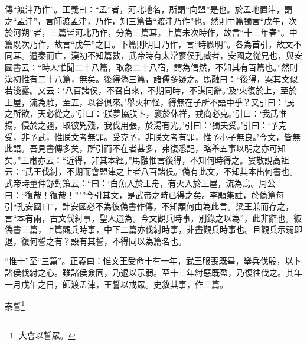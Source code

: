 {\noindent\zhuan{}\fzbyks 傳“渡津乃作”。正義曰：“孟”者，河北地名，所謂“向盟”是也。於孟地置津，謂之“孟津”，言師渡孟津，乃作，知三篇皆“渡津乃作”也。然則中篇獨言“戊午，次於河朔”者，三篇皆河北乃作，分為三篇耳。上篇未次時作，故言“十三年春”。中篇既次乃作，故言“戊午”之日。下篇則明日乃作，言“時厥明”。各為首引，故文不同耳。遭秦而亡，漢初不知篇數，武帝時有太常蓼侯孔臧者，安國之從兄也，與安國書云：“時人惟聞二十八篇，取象二十八宿，謂為信然，不知其有百篇也。”然則漢初惟有二十八篇，無矣。後得偽三篇，諸儒多疑之。馬融曰：“後得，案其文似若淺露。又云：‘八百諸侯，不召自來，不期同時，不謀同辭。’及‘火復於上，至於王屋，流為雕，至五，以谷俱來。’舉火神怪，得無在子所不語中乎？又引曰：‘民之所欲，天必從之。’引曰：‘朕夢協朕卜，襲於休祥，戎商必克。’引曰：‘我武惟揚，侵於之疆，取彼兇殘，我伐用張，於湯有光。’引曰：‘獨夫受。’引曰：‘予克受，非予武，惟朕文考無罪。受克予，非朕文考有罪，惟予小子無良。’今文，皆無此語。吾見書傳多矣，所引而不在者甚多，弗復悉記，略舉五事以明之亦可知矣。”王肅亦云：“近得，非其本經。”馬融惟言後得，不知何時得之。婁敬說高祖云：“武王伐紂，不期而會盟津之上者八百諸侯。”偽有此文，不知其本出何書也。武帝時董仲舒對策云：“曰：‘白魚入於王舟，有火入於王屋，流為烏。周公曰：“復哉！復哉！”’”今引其文，是武帝之時已得之矣。李顒集註，於偽篇每引“孔安國曰”，計安國必不為彼偽書作傳，不知顒何由為此言。梁王兼而存之，言“本有兩，古文伐紂事，聖人選為。今文觀兵時事，別錄之以為”，此非辭也。彼偽書三篇，上篇觀兵時事，中下二篇亦伐紂時事，非盡觀兵時事也。且觀兵示弱即退，復何誓之有？設有其誓，不得同以為篇名也。 \par}

{\noindent\shu{}\fzkt “惟十”至“三篇”。正義曰：惟文王受命十有一年，武王服喪既畢，舉兵伐殷，以卜諸侯伐紂之心。雖諸侯僉同，乃退以示弱。至十三年紂惡既盈，乃復往伐之。其年一月戊午之日，師渡孟津，王誓以戒眾。史敘其事，作三篇。 \par}

泰誓\footnote{大會以誓眾。}

